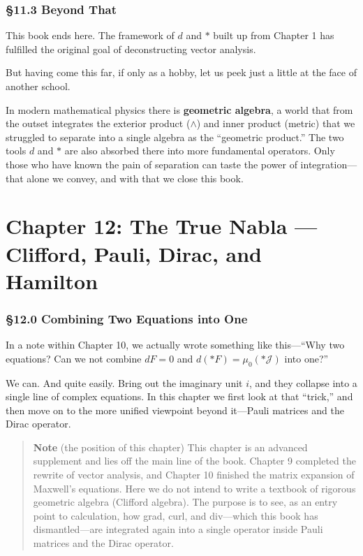\hypertarget{beyond-that}{%
\subsection{§11.3 Beyond That}\label{beyond-that}}

This book ends here. The framework of \(d\) and \(\ast\) built up from
Chapter 1 has fulfilled the original goal of deconstructing vector
analysis.

But having come this far, if only as a hobby, let us peek just a little
at the face of another school.

In modern mathematical physics there is \textbf{geometric algebra}, a
world that from the outset integrates the exterior product (\(\wedge\))
and inner product (metric) that we struggled to separate into a single
algebra as the ``geometric product.'' The two tools \(d\) and \(\ast\)
are also absorbed there into more fundamental operators. Only those who
have known the pain of separation can taste the power of
integration---that alone we convey, and with that we close this book.

\newpage

\hypertarget{chapter-12-the-true-nabla-clifford-pauli-dirac-and-hamilton}{%
\chapter{Chapter 12: The True Nabla --- Clifford, Pauli, Dirac, and
Hamilton}\label{chapter-12-the-true-nabla-clifford-pauli-dirac-and-hamilton}}

\hypertarget{combining-two-equations-into-one}{%
\subsection{§12.0 Combining Two Equations into
One}\label{combining-two-equations-into-one}}

In a note within Chapter 10, we actually wrote something like
this---``Why two equations? Can we not combine \(dF=0\) and
\(d(\ast F)=\mu_0(\ast\mathcal{J})\) into one?''

We can. And quite easily. Bring out the imaginary unit \(i\), and they
collapse into a single line of complex equations. In this chapter we
first look at that ``trick,'' and then move on to the more unified
viewpoint beyond it---Pauli matrices and the Dirac operator.

\begin{quote}
\textbf{Note} (the position of this chapter) This chapter is an advanced
supplement and lies off the main line of the book. Chapter 9 completed
the rewrite of vector analysis, and Chapter 10 finished the matrix
expansion of Maxwell's equations. Here we do not intend to write a
textbook of rigorous geometric algebra (Clifford algebra). The purpose
is to see, as an entry point to calculation, how grad, curl, and
div---which this book has dismantled---are integrated again into a
single operator inside Pauli matrices and the Dirac operator.
\end{quote}

